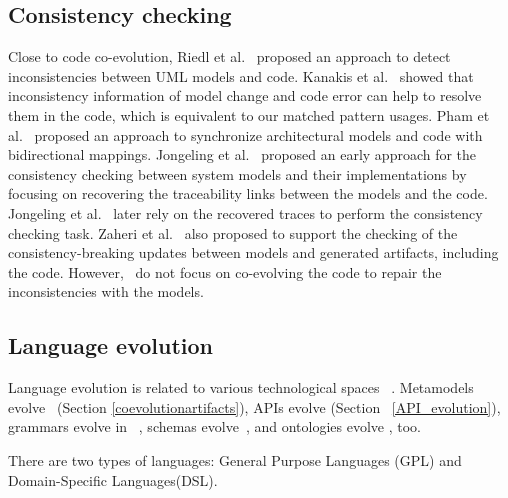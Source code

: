  \subsection{Consistency checking }
 \label{Consistency_checking}
  Close to code co-evolution, Riedl et al.~\cite{riedl2014towards} proposed an approach to detect inconsistencies between UML models and code. Kanakis et al.~\cite{kanakis2019empirical} showed that inconsistency information of model change and code error can help to resolve them in the code, which is equivalent to our matched pattern usages. 
 Pham et al.~\cite{pham2017bidirectional} proposed an approach to synchronize architectural models and code with bidirectional mappings.
 Jongeling et al.~\cite{jongeling2020towards} proposed an early approach for the consistency checking between system models and their implementations by focusing on recovering the traceability links between the models and the code. Jongeling et al.~\cite{jongeling2022Structural} later rely on the recovered traces to perform the consistency checking task.  %
 Zaheri et al.~\cite{zaheri2021towards} also proposed to support the checking of the consistency-breaking updates between models and generated artifacts, including the code. However,~\cite{pham2017bidirectional,jongeling2020towards,jongeling2022Structural,zaheri2021towards} do not focus on co-evolving the code to repair the inconsistencies with the models. 
 \subsection{Language evolution}
 
Language evolution is related to  various technological spaces ~\cite{ivanov2002technological}. Metamodels evolve~\cite{favre2003meta} (Section \ref{coevolutionartifacts}), APIs evolve \cite{dig2006apis} (Section ~\ref{API_evolution}), grammars evolve in ~\cite{5279907}, schemas evolve~\cite{lammel2001format,meyer1996schema}, and ontologies evolve \cite{flouris2008ontology}, too.
  
   There are two types of languages: General Purpose Languages (GPL) and Domain-Specific Languages(DSL). 
   
